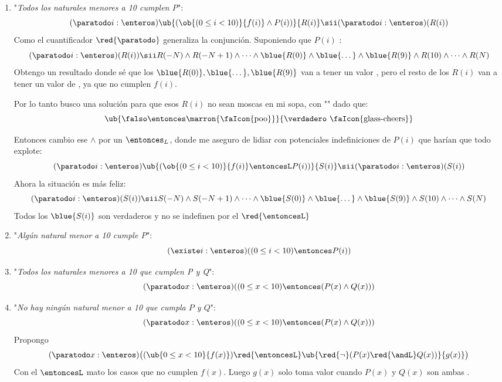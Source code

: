 \begin{enumerate}[label=\alph*)]
  \item "\textit{Todos los naturales menores a 10 cumplen P}":
        $$
          (\paratodo i : \enteros)\ub{(\ob{(0 \leq i < 10)}{f(i)} \land P(i))}{R(i)} \sii (\paratodo i : \enteros)(R(i))
        $$
        Como el cuantificador $\red{\paratodo}$ generaliza la conjunción. Suponiendo que $P(i)$ :
        $$
          (\paratodo i : \enteros)(R(i))
          \sii
          R(-N) \land R(-N+1)
          \land \dots \land
          \blue{R(0)}
          \land \blue{\dots} \land
          \blue{R(9)} \land
          R(10)
          \land \dots \land
          R(N)
        $$
        Obtengo un resultado donde sé que los $\blue{R(0)},\blue{\dots}, \blue{R(9)}$ van a tener un valor \verdadero, pero el resto de los $R(i)$ van a tener
        un valor de \falso, ya que no cumplen $f(i)$.\par
        Por lo tanto busco una solución para que esos $R(i)$ no sean moscas en mi sopa, con "\red{$\entonces$}" dado que:
        $$
          \ub{\falso \entonces \text{\marron{\faIcon{poo}}}}{\verdadero \text{ \faIcon{glass-cheers}}}
        $$

        Entonces cambio ese $\land$ por un $\entonces_L$, donde me aseguro de lidiar con potenciales
        indefiniciones de $P(i)$ que harían que todo explote:
        $$
          (\paratodo i : \enteros)\ub{(\ob{(0 \leq i < 10)}{f(i)} \entoncesL P(i))}{S(i)} \sii (\paratodo i : \enteros)(S(i))
        $$
        Ahora la situación es más feliz:
        $$
          (\paratodo i : \enteros)(S(i))
          \sii
          S(-N) \land S(-N+1)
          \land \dots \land
          \blue{S(0)}
          \land \blue{\dots} \land
          \blue{S(9)} \land
          S(10)
          \land \dots \land
          S(N)
        $$
        Todos los $\blue{S(i)}$ son verdaderos y no se indefinen por el $\red{\entoncesL}$

  \item "\textit{Algún natural menor a 10 cumple P}":
        $$
          (\existe i : \enteros)((0 \leq i < 10) \entonces P(i))
        $$

  \item "\textit{Todos los naturales menores a 10 que cumplen P y Q}":
        $$
          (\paratodo x : \enteros)((0 \leq x < 10) \entonces (P(x) \land Q(x)))
        $$

  \item "\textit{No hay ningún natural menor a 10 que cumpla $P$ y $Q$}":
        $$
          (\paratodo x : \enteros)((0 \leq x < 10) \entonces (P(x) \land Q(x)))
        $$
        Propongo
        $$
          (\paratodo x : \enteros)\bigl((\ub{0 \leq x < 10}{f(x)}) \red{\entoncesL} \ub{
          \red{\neg}(P(x) \red{\andL} Q(x))} {g(x)}\bigr)
        $$
        Con el $\entoncesL$ mato los casos que no cumplen $f(x)$. Luego $g(x)$ solo toma valor \falso cuando $P(x)$ y $Q(x)$ son ambas \verdadero.
\end{enumerate}


